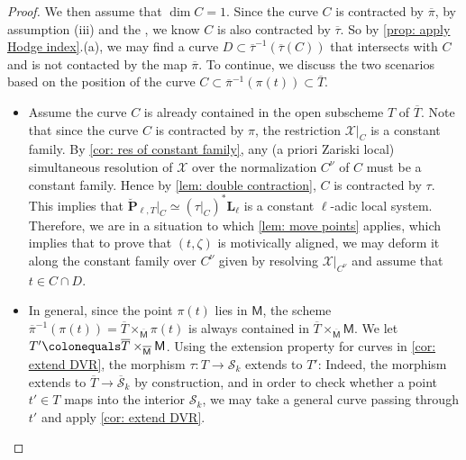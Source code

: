 \documentclass[11pt, letterpaper]{amsart}
\theoremstyle{plain}
\theoremstyle{definition}
\newcommand{\<}{\langle}
\renewcommand{\>}{\rangle}
\newcommand{\shS}{\mathscr{S}}
\newcommand{\sfM}{\mathsf{M}}
\newcommand{\sX}{\mathcal{X}}
\newcommand{\bL}{\mathbf{L}}
\newcommand{\bP}{\mathbf{P}}
\begin{document}
\begin{proof}
     We then assume that $\dim C = 1$.
     Since the curve $C$ is contracted by $\overline{\pi}$, by assumption (iii) and the , we know $C$ is also contracted by $\overline{\tau}$.
     So by \cref{prop: apply Hodge index}.(a), we may find a curve $D \subset \overline{\tau}^{-1}(\overline{\tau}(C))$ that intersects with $C$ and is not contacted by the map $\overline{\pi}$.
     To continue, we discuss the two scenarios based on the position of the curve $C\subset \overline{\pi}^{-1}(\pi(t)) \subset \overline{T}$.
     \begin{itemize}
     	\item[(b1)] Assume the curve $C$ is already contained in the open subscheme $T$ of $\overline{T}$.
        Note that since the curve $C$ is contracted by $\pi$, the restriction $\sX|_{C}$ is a constant family. 
            By \cref{cor: res of constant family}, any (a priori Zariski local) simultaneous resolution of $\sX$ over the normalization $C^\nu$ of $C$ must be a constant family. 
            Hence by \cref{lem: double contraction}, $C$ is contracted by $\tau$. 
     	This implies that $\breve{\bP}_{\ell, T}|_C \simeq (\tau|_C)^* \bL_\ell$ is a constant $\ell$-adic local system. 
     	Therefore, we are in a situation to which \cref{lem: move points} applies, which implies that to prove that $(t, \zeta)$ is motivically aligned, we may deform it along the constant family over $C^\nu$ given by resolving $\sX|_{C^\nu}$ and assume that $t \in C \cap D$. 
     	\item[(b2)] In general, since the point $\pi(t)$ lies in $\sfM$, the scheme $\overline{\pi}^{-1}(\pi(t))=\overline{T} \times_{\overline{\sfM}} \pi(t)$ is always contained in $\overline{T} \times_{\overline{\sfM}} \sfM$.
     	We let $T' \colonequals \overline{T} \times_{\overline{\sfM}} \sfM$.
     	Using the extension property for curves in \cref{cor: extend DVR}, the morphism $\tau : T \to \shS_k$ extends to $T'$: Indeed, the morphism extends to $\overline{T} \to \overline{\shS}_k$ by construction, and in order to check whether a point $t' \in T$ maps into the interior $\shS_k$, we may take a general curve passing through $t'$ and apply \cref{cor: extend DVR}.
        

\end{itemize}
\end{proof}
\end{document}
